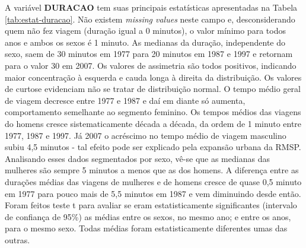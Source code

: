 
A variável \textbf{DURACAO} tem suas principais estatísticas apresentadas na Tabela \ref{tab:estat-duracao}.
Não existem \textit{missing values} neste campo e, desconsiderando quem não fez viagem (duração igual a 0 minutos), o valor mínimo para todos anos e ambos os sexos é 1 minuto.
As medianas da duração, independente do sexo, saem de 30 minutos em 1977 para 20 minutos em 1987 e 1997 e retornam para o valor 30 em 2007.
Os valores de assimetria são todos positivos, indicando maior concentração à esquerda e cauda longa à direita da distribuição.
Os valores de curtose evidenciam não se tratar de distribuição normal.
O tempo médio geral de viagem decresce entre 1977 e 1987 e daí em diante só aumenta, comportamento semelhante ao segmento feminino.
Os tempos médios das viagens do homens cresce sistematicamente década a década, da ordem de 1 minuto entre 1977, 1987 e 1997. Já 2007 o acréscimo no tempo médio de viagem masculino subiu 4,5 minutos - tal efeito pode ser explicado pela expansão urbana da RMSP.
Analisando esses dados segmentados por sexo, vê-se que as medianas das mulheres são sempre 5 minutos a menos que as dos homens. 
A diferença entre as durações médias das viagens de mulheres e de homens cresce de quase 0,5 minuto em 1977 para pouco mais de 5,5 minutos em 1987 e vem diminuindo desde então.
Foram feitos teste t para avaliar se eram estatisticamente significantes (intervalo de confiança de 95\%) as médias entre os sexos, no mesmo ano; e entre os anos, para o mesmo sexo. Todas médias foram estatisticamente diferentes umas das outras.

